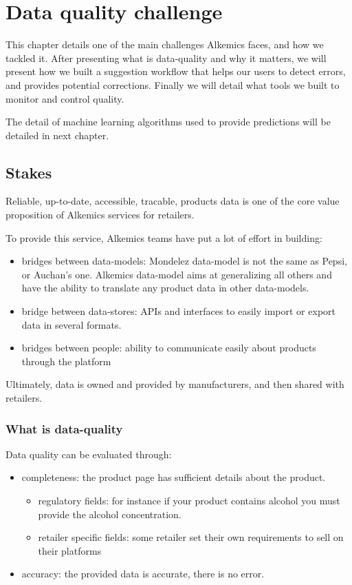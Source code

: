 \chapter{Data quality challenge}

This chapter details one of the main challenges Alkemics faces, and how we tackled it. 
After presenting what is data-quality and why it matters, we will present how we built a suggestion workflow that helps our users to detect errors, and provides potential corrections. Finally we will detail what tools we built to monitor and control quality.

The detail of machine learning algorithms used to provide predictions will be detailed in next chapter.

\section{Stakes}

Reliable, up-to-date, accessible, tracable, products data is one of the core value proposition of Alkemics services for retailers.

To provide this service, Alkemics teams have put a lot of effort in building:

\begin{itemize}
	\item bridges between data-models: Mondelez data-model is not the same as Pepsi, or Auchan's one. Alkemics data-model aims at generalizing all others and have the ability to translate any product data in other data-models.
	\item bridge between data-stores: APIs and interfaces to easily import or export data in several formats.
	\item bridges between people: ability to communicate easily about products through the platform
\end{itemize} 

Ultimately, data is owned and provided by manufacturers, and then shared with retailers.

\subsection{What is data-quality}

Data quality can be evaluated through:
\begin{itemize}
\item completeness: the product page has sufficient details about the product.
	\begin{itemize}
		\item regulatory fields: for instance if your product contains alcohol you must provide the alcohol concentration.
		\item retailer specific fields: some retailer set their own requirements to sell on their platforms
	\end{itemize}
\item accuracy: the provided data is accurate, there is no error.
\end{itemize}


